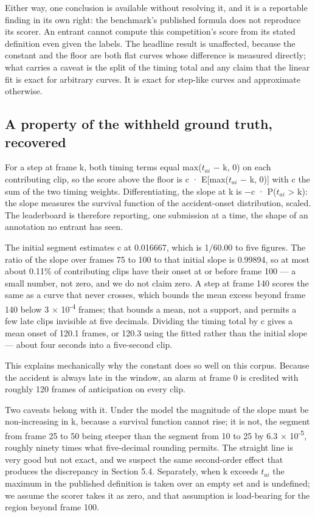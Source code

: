 Either way, one conclusion is available without resolving it, and it is a reportable finding in its own right: the benchmark's published formula does not reproduce its scorer. An entrant cannot compute this competition's score from its stated definition even given the labels. The headline result is unaffected, because the constant and the floor are both flat curves whose difference is measured directly; what carries a caveat is the split of the timing total and any claim that the linear fit is exact for arbitrary curves. It is exact for step-like curves and approximate otherwise.


\subsection{A property of the withheld ground truth, recovered}
For a step at frame k, both timing terms equal max(\(t_{ai}\) − k, 0) on each contributing clip, so the score above the floor is c · E[max(\(t_{ai}\) − k, 0)] with c the sum of the two timing weights. Differentiating, the slope at k is −c · P(\(t_{ai}\) \textgreater{} k): the slope measures the survival function of the accident-onset distribution, scaled. The leaderboard is therefore reporting, one submission at a time, the shape of an annotation no entrant has seen.

The initial segment estimates c at 0.016667, which is 1/60.00 to five figures. The ratio of the slope over frames 75 to 100 to that initial slope is 0.99894, so at most about 0.11\% of contributing clips have their onset at or before frame 100 --- a small number, not zero, and we do not claim zero. A step at frame 140 scores the same as a curve that never crosses, which bounds the mean excess beyond frame 140 below 3 × 10\textsuperscript{-4} frames; that bounds a mean, not a support, and permits a few late clips invisible at five decimals. Dividing the timing total by c gives a mean onset of 120.1 frames, or 120.3 using the fitted rather than the initial slope --- about four seconds into a five-second clip.

This explains mechanically why the constant does so well on this corpus. Because the accident is always late in the window, an alarm at frame 0 is credited with roughly 120 frames of anticipation on every clip.

Two caveats belong with it. Under the model the magnitude of the slope must be non-increasing in k, because a survival function cannot rise; it is not, the segment from frame 25 to 50 being steeper than the segment from 10 to 25 by 6.3 × 10\textsuperscript{-5}, roughly ninety times what five-decimal rounding permits. The straight line is very good but not exact, and we suspect the same second-order effect that produces the discrepancy in Section 5.4. Separately, when k exceeds \(t_{ai}\) the maximum in the published definition is taken over an empty set and is undefined; we assume the scorer takes it as zero, and that assumption is load-bearing for the region beyond frame 100.

